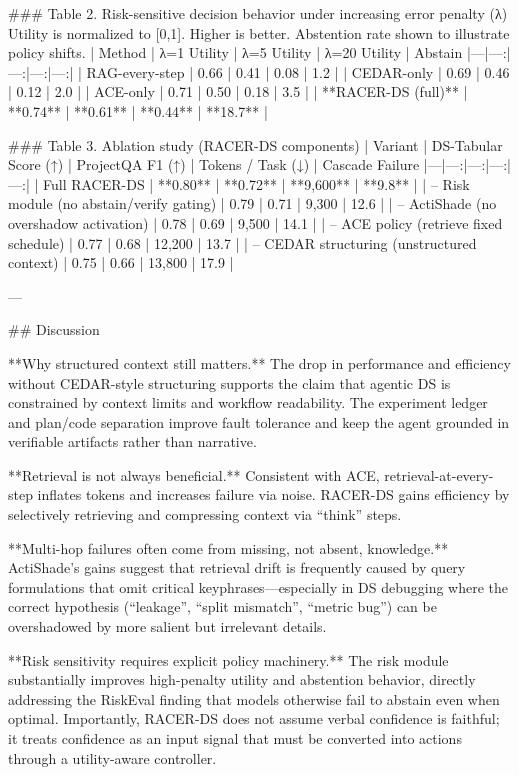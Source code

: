 ### Table 2. Risk-sensitive decision behavior under increasing error penalty (λ)  
Utility is normalized to [0,1]. Higher is better. Abstention rate shown to illustrate policy shifts.  
| Method | λ=1 Utility | λ=5 Utility | λ=20 Utility | Abstain %
|---|---:|---:|---:|---:|
| RAG-every-step | 0.66 | 0.41 | 0.08 | 1.2 |
| CEDAR-only | 0.69 | 0.46 | 0.12 | 2.0 |
| ACE-only | 0.71 | 0.50 | 0.18 | 3.5 |
| **RACER-DS (full)** | **0.74** | **0.61** | **0.44** | **18.7** |

### Table 3. Ablation study (RACER-DS components)  
| Variant | DS-Tabular Score (↑) | ProjectQA F1 (↑) | Tokens / Task (↓) | Cascade Failure %
|---|---:|---:|---:|---:|
| Full RACER-DS | **0.80** | **0.72** | **9,600** | **9.8** |
| – Risk module (no abstain/verify gating) | 0.79 | 0.71 | 9,300 | 12.6 |
| – ActiShade (no overshadow activation) | 0.78 | 0.69 | 9,500 | 14.1 |
| – ACE policy (retrieve fixed schedule) | 0.77 | 0.68 | 12,200 | 13.7 |
| – CEDAR structuring (unstructured context) | 0.75 | 0.66 | 13,800 | 17.9 |

---

## Discussion  

**Why structured context still matters.** The drop in performance and efficiency without CEDAR-style structuring supports the claim that agentic DS is constrained by context limits and workflow readability. The experiment ledger and plan/code separation improve fault tolerance and keep the agent grounded in verifiable artifacts rather than narrative.

**Retrieval is not always beneficial.** Consistent with ACE, retrieval-at-every-step inflates tokens and increases failure via noise. RACER-DS gains efficiency by selectively retrieving and compressing context via “think” steps.

**Multi-hop failures often come from missing, not absent, knowledge.** ActiShade’s gains suggest that retrieval drift is frequently caused by query formulations that omit critical keyphrases—especially in DS debugging where the correct hypothesis (“leakage”, “split mismatch”, “metric bug”) can be overshadowed by more salient but irrelevant details.

**Risk sensitivity requires explicit policy machinery.** The risk module substantially improves high-penalty utility and abstention behavior, directly addressing the RiskEval finding that models otherwise fail to abstain even when optimal. Importantly, RACER-DS does not assume verbal confidence is faithful; it treats confidence as an input signal that must be converted into actions through a utility-aware controller.

